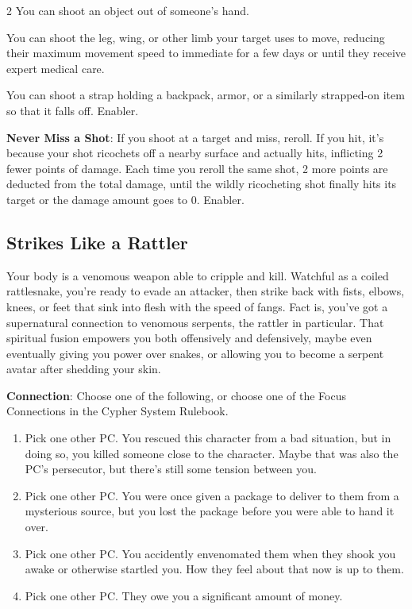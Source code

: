 \begin{multicols}{2}
You can shoot an object out of someone’s hand. 

You can shoot the leg, wing, or other limb your target uses to move, reducing their maximum movement speed to immediate for a few days or until they receive expert medical care. 

You can shoot a strap holding a backpack, armor, or a similarly strapped-on item so that it falls off. 
Enabler. 

\textbf{Never Miss a Shot}: If you shoot at a target and miss, reroll. If you hit, it’s because your shot ricochets off a nearby surface and actually hits, inflicting 2 fewer points of damage. Each time you reroll the same shot, 2 more points are deducted from the total damage, until the wildly ricocheting shot finally hits its target or the damage amount goes to 0. Enabler. 

\subsection{Strikes Like a Rattler}

Your body is a venomous weapon able to cripple and kill. Watchful as a coiled rattlesnake, you’re ready to evade an attacker, then strike back with fists, elbows, knees, or feet that sink into flesh with the speed of fangs. Fact is, you’ve got a supernatural connection to venomous serpents, the rattler in particular. That spiritual fusion empowers you both offensively and defensively, maybe even eventually giving you power over snakes, or allowing you to become a serpent avatar after shedding your skin.

\textbf{Connection}: Choose one of the following, or choose one of the Focus Connections in the Cypher System Rulebook. 

\begin{enumerate}
\item Pick one other PC. You rescued this character from a bad situation, but in doing so, you killed someone close to the character. Maybe that was also the PC’s persecutor, but there’s still some tension between you. 
\item Pick one other PC. You were once given a package to deliver to them from a mysterious source, but you lost the package before you were able to hand it over. 
\item Pick one other PC. You accidently envenomated them when they shook you awake or otherwise startled you. How they feel about that now is up to them. 
\item Pick one other PC. They owe you a significant amount of money. 
\end{enumerate}


\end{multicols}
